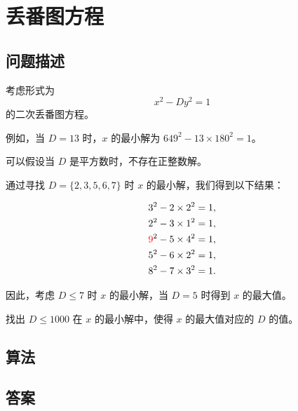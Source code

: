 \section{丢番图方程}
\subsection{问题描述}
\begin{tcolorbox}
	考虑形式为
	\[ x^2 - D y^2 = 1 \]
	的二次丢番图方程。

	例如，当 \( D = 13 \) 时，\( x \) 的最小解为 \( 649^2 - 13 \times 180^2 = 1 \)。

	可以假设当 \( D \) 是平方数时，不存在正整数解。

	通过寻找 \( D = \{2, 3, 5, 6, 7\} \) 时 \( x \) 的最小解，我们得到以下结果：

	\begin{align*}
		3^2 - 2 \times 2^2       & = 1, \\
		2^2 - 3 \times 1^2       & = 1, \\
		\textcolor{red}{9}^2 - 5 \times 4^2 & = 1, \\
		5^2 - 6 \times 2^2       & = 1, \\
		8^2 - 7 \times 3^2       & = 1.
	\end{align*}

	因此，考虑 \( D \leq 7 \) 时 \( x \) 的最小解，当 \( D = 5 \) 时得到 \( x \) 的最大值。

	找出 \( D \leq 1000 \) 在 \( x \) 的最小解中，使得 \( x \) 的最大值对应的 \( D \) 的值。

\end{tcolorbox}

\subsection{算法}

\subsection{答案}
